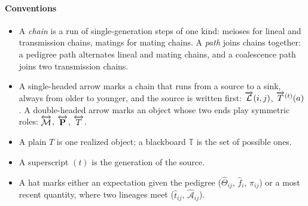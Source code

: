 \documentclass[12pt]{article}
\numberwithin{equation}{section}
\begin{document}
\paragraph{Conventions}
\begin{itemize}
    \item A \emph{chain} is a run of single-generation steps of one kind: meioses for lineal and transmission chains, matings for mating chains.
    A \emph{path} joins chains together: a pedigree path alternates lineal and mating chains, and a coalescence path joins two transmission chains.
    \item A single-headed arrow marks a chain that runs from a source to a sink, always from older to younger, and the source is written first: $\overrightarrow{\mathcal{L}}(i,j)$, $\overrightarrow{T}^{(t)}(a)$.
    A double-headed arrow marks an object whose two ends play symmetric roles: $\overleftrightarrow{\mathcal{M}}$, $\overleftrightarrow{\mathbf{P}}$, $\overleftrightarrow{T}$.
    \item A plain $T$ is one realized object; a blackboard $\mathbb{T}$ is the set of possible ones.
    \item A superscript $(t)$ is the generation of the source.
    \item A hat marks either an expectation given the pedigree ($\widehat\Theta_{ij}$, $\widehat{f}_i$, $\widehat\pi_{ij}$) or a most recent quantity, where two lineages meet ($\hat{t}_{ij}$, $\widehat{\mathcal{A}}_{ij}$).
\end{itemize}
\end{document}
